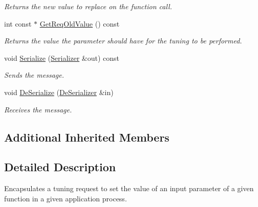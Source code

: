 \begin{DoxyCompactItemize}
\begin{DoxyCompactList}\small\item\em Returns the new value to replace on the function call. \end{DoxyCompactList}\item 
\hypertarget{class_common_1_1_function_param_change_request_ace9a5ed080c6acc0f672dadb3ecf5b5c}{int const $\ast$ \hyperlink{class_common_1_1_function_param_change_request_ace9a5ed080c6acc0f672dadb3ecf5b5c}{Get\-Req\-Old\-Value} () const }\label{class_common_1_1_function_param_change_request_ace9a5ed080c6acc0f672dadb3ecf5b5c}

\begin{DoxyCompactList}\small\item\em Returns the value the parameter should have for the tuning to be performed. \end{DoxyCompactList}\item 
\hypertarget{class_common_1_1_function_param_change_request_a238498837adb7899625f0ec05f7216fa}{void \hyperlink{class_common_1_1_function_param_change_request_a238498837adb7899625f0ec05f7216fa}{Serialize} (\hyperlink{class_common_1_1_serializer}{Serializer} \&out) const }\label{class_common_1_1_function_param_change_request_a238498837adb7899625f0ec05f7216fa}

\begin{DoxyCompactList}\small\item\em Sends the message. \end{DoxyCompactList}\item 
\hypertarget{class_common_1_1_function_param_change_request_aed95dbd8bf62c573a4700980ae88b8b0}{void \hyperlink{class_common_1_1_function_param_change_request_aed95dbd8bf62c573a4700980ae88b8b0}{De\-Serialize} (\hyperlink{class_common_1_1_de_serializer}{De\-Serializer} \&in)}\label{class_common_1_1_function_param_change_request_aed95dbd8bf62c573a4700980ae88b8b0}

\begin{DoxyCompactList}\small\item\em Receives the message. \end{DoxyCompactList}\end{DoxyCompactItemize}
\subsection*{Additional Inherited Members}


\subsection{Detailed Description}
Encapsulates a tuning request to set the value of an input parameter of a given function in a given application process. 

